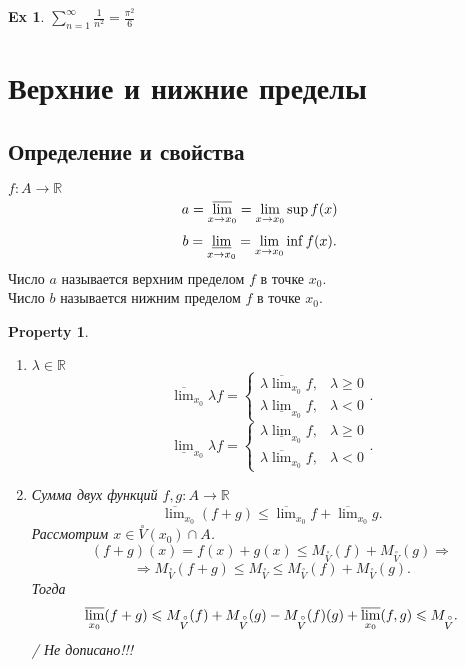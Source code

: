 \documentclass[11pt]{book}
\newcommand{\R}{\mathbb{R}}
\newcommand{\slim}{\sum\limits}
\newcommand{\pivi}{\stackrel \circ }
\renewcommand{\le}{\leqslant}
\renewcommand{\ge}{\geqslant}
\theoremstyle{definition}
\theoremstyle{plain}
\theoremstyle{plain}
\newtheorem*{prop}{Property}
\theoremstyle{definition}
\newtheorem*{ex}{Ex}
\theoremstyle{remark}
\begin{document}
\begin{ex}
$\slim_{n = 1}^\infty{\frac{1}{n^2}} = \frac{\pi^2}{6}$
\end{ex}
\section{Верхние и нижние пределы}
\subsection{Определение и свойства}\label{ques_30}
\begin{defn}
    $f: A \to \R$\\
    \[
	a = \varlimsup_{x \to x_0}=\lim\limits_{x \to x_0} \sup f(x)
    \]\[
    b = \varliminf_{x \to x_0}=\lim\limits_{x \to x_0} \inf f(x)
    .\] 
    Число $a$ называется верхним пределом $f$ в точке $x_0$. \\
Число $b$ называется нижним пределом $f$ в точке $x_0$.
\end{defn}
\begin{prop}
    \begin{enumerate}
        \item $\lambda \in \R$ 
	    \[
		\overline \lim_{x_0} \lambda f = \left \{
		    \begin{array}{ll}
			\lambda \overline \lim_{x_0} f, & \lambda \ge 0\\
			\lambda \underline \lim_{x_0} f, & \lambda <0
		    \end{array}
		    \right .
	    .\] 
	    \[
		\underline \lim_{x_0} \lambda f = \left \{
		    \begin{array}{ll}
			\lambda \underline \lim_{x_0} f, & \lambda \ge 0\\
			\lambda \overline \lim_{x_0} f, & \lambda <0
		    \end{array}
		    \right .
	    .\] 
	\item Сумма двух функций $f, g : A \to \R$\\
	    \[
		\overline {\lim}_{x_0} (f+g) \le \overline\lim_{x_0} f + \overline \lim_{x_0} g
	    .\] 
	    Рассмотрим $x \in \pivi V(x_0)\cap A$.
	    \[
		(f+g)(x) = f(x) + g(x) \le M_{\pivi V} (f) + M_{\pivi V} (g) \Rightarrow 
	    \] 
	    \[
		\Rightarrow M_{\pivi V}  (f + g) \le M_{\pivi V} \le  M_{\pivi V} (f) + M_{\pivi V} (g) 
	    .\] 
	    Тогда 
	    \[
		\varlimsup _{x_0} (f+g) \le M_{\pivi V} (f) + M_{\pivi V}(g) - M_{\pivi V}(f)(g) + \varlimsup_{x_0}(f, g) \le M_{\pivi V} 
	    .\] 
	    / Не дописано!!!
    \end{enumerate}
\end{prop}
\end{document}
